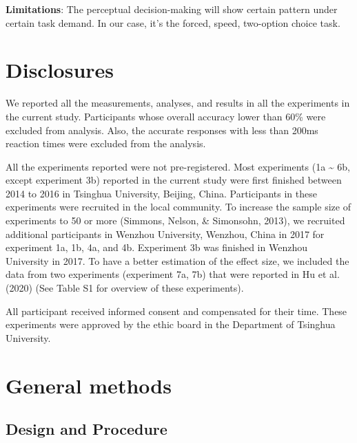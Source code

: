 \documentclass[
  english,
  man]{apa6}
\begin{document}
\textbf{Limitations}:
The perceptual decision-making will show certain pattern under certain task demand. In our case, it's the forced, speed, two-option choice task.

\hypertarget{disclosures}{%
\section{Disclosures}\label{disclosures}}

We reported all the measurements, analyses, and results in all the experiments in the current study. Participants whose overall accuracy lower than 60\% were excluded from analysis. Also, the accurate responses with less than 200ms reaction times were excluded from the analysis.

All the experiments reported were not pre-registered. Most experiments (1a \textasciitilde{} 6b, except experiment 3b) reported in the current study were first finished between 2014 to 2016 in Tsinghua University, Beijing, China. Participants in these experiments were recruited in the local community. To increase the sample size of experiments to 50 or more (Simmons, Nelson, \& Simonsohn, 2013), we recruited additional participants in Wenzhou University, Wenzhou, China in 2017 for experiment 1a, 1b, 4a, and 4b. Experiment 3b was finished in Wenzhou University in 2017. To have a better estimation of the effect size, we included the data from two experiments (experiment 7a, 7b) that were reported in Hu et al. (2020) (See Table S1 for overview of these experiments).

All participant received informed consent and compensated for their time. These experiments were approved by the ethic board in the Department of Tsinghua University.

\hypertarget{general-methods}{%
\section{General methods}\label{general-methods}}

\hypertarget{design-and-procedure}{%
\subsection{Design and Procedure}\label{design-and-procedure}}
\end{document}
